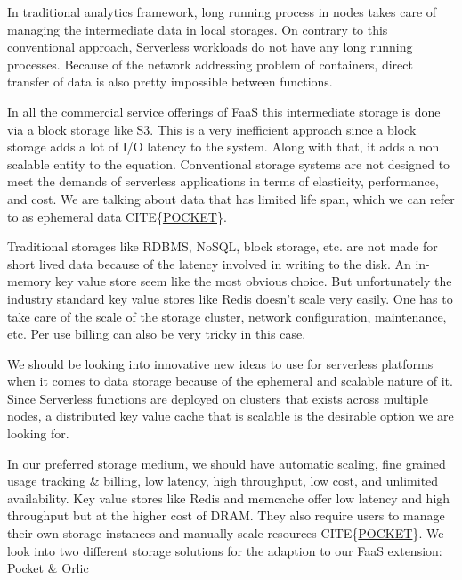 \documentclass[12pt,titlepage]{article}
\begin{document}
In traditional analytics framework, long running process in nodes takes care of
managing the intermediate data in local storages. On contrary to this
conventional approach, Serverless workloads do not have any long running
processes. Because of the network addressing problem of containers, direct
transfer of data is also pretty impossible between functions.

In all the commercial service offerings of FaaS this intermediate storage is
done via a block storage like S3. This is a very inefficient approach since a
block storage adds a lot of I/O latency to the system. Along with that, it adds
a non scalable entity to the equation. Conventional storage systems are not
designed to meet the demands of serverless applications in terms of elasticity,
performance, and cost. We are talking about data that has limited life span,
which we can refer to as ephemeral data CITE\{\href{https://www.usenix.org/system/files/osdi18-klimovic.pdf}{POCKET}\}.

Traditional storages like RDBMS, NoSQL, block storage, etc. are not made for
short lived data because of the latency involved in writing to the disk. An
in-memory key value store seem like the most obvious choice. But unfortunately
the industry standard key value stores like Redis doesn't scale very easily. One
has to take care of the scale of the storage cluster, network configuration,
maintenance, etc. Per use billing can also be very tricky in this case.

We should be looking into innovative new ideas to use for serverless platforms when
it comes to data storage because of the ephemeral and scalable nature of it.
Since Serverless functions are deployed on clusters that exists across multiple
nodes, a distributed key value cache that is scalable is the desirable option we
are looking for.


In our preferred storage medium, we should have automatic scaling, fine grained
usage tracking \& billing, low latency, high throughput, low cost, and unlimited
availability. Key value stores like Redis and memcache offer low latency and
high throughput but at the higher cost of DRAM. They also require users to
manage their own storage instances and manually scale resources CITE\{\href{https://www.usenix.org/system/files/osdi18-klimovic.pdf}{POCKET}\}. We look into
two different storage solutions for the adaption to our FaaS extension: Pocket \& Orlic
\end{document}
